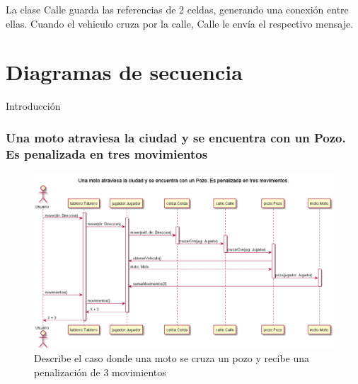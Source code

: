 \documentclass[titlepage,a4paper]{article}
\begin{document}
La clase Calle guarda las referencias de 2 celdas, generando una conexión entre ellas. Cuando el vehiculo cruza por la calle, Calle le envía el respectivo mensaje.




\section{Diagramas de secuencia}\label{sec:diagramasdesecuencia}

Introducción


\subsubsection[Una moto atraviesa la ciudad y se encuentra con un Pozo. Es penalizada en tres movimientos]{Una moto atraviesa la ciudad y se encuentra con un Pozo. Es penalizada en tres movimientos}

\begin{figure}[H]
  \centering
  \includegraphics[width=1\textwidth]{diagramas/SecuenciaUnaMotoCruzaUnPozoYEsPenalizado.png}
  \caption{\label{fig:class01}Describe el caso donde una moto se cruza un pozo y recibe una penalización de 3 movimientos}
\end{figure}
\end{document}
